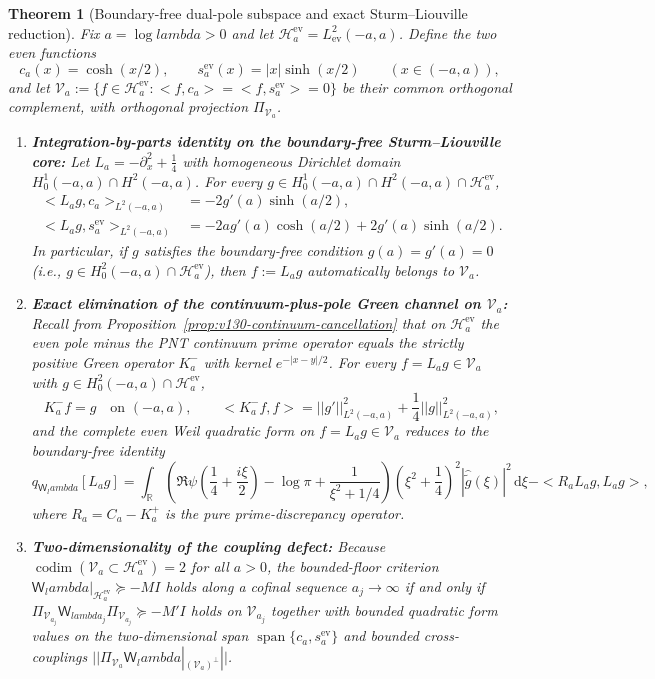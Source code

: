 \documentclass[11pt]{article}
\def\lambda{lambda}%
\def\norm#1{||#1||}%
\def\ip#1#2{<#1,#2>}%
\newtheorem{theorem}{Theorem}[section]
\theoremstyle{remark}
\newcommand{\norm}[1]{\left\lVert #1\right\rVert}
\newcommand{\ip}[2]{\left\langle #1,#2\right\rangle}
\newcommand{\dd}{\mathrm d}
\begin{document}
\begin{theorem}[Boundary-free dual-pole subspace and exact Sturm--Liouville reduction]\label{thm:v2-dual-pole}
Fix $a=\log\lambda>0$ and let $\mathcal H_a^{\mathrm{ev}}=L^2_{\mathrm{ev}}(-a,a)$. Define the two even functions
\[
 c_a(x)=\cosh(x/2),\qquad s_a^{\mathrm{ev}}(x)=|x|\sinh(x/2)\qquad (x\in(-a,a)),
\]
and let $\mathcal V_a := \{f\in \mathcal H_a^{\mathrm{ev}} : \ip{f}{c_a}=\ip{f}{s_a^{\mathrm{ev}}}=0\}$ be their common orthogonal complement, with orthogonal projection $\Pi_{\mathcal V_a}$.
\begin{enumerate}[label=(\alph*)]
\item \textbf{Integration-by-parts identity on the boundary-free Sturm--Liouville core:} Let $L_a = -\partial_x^2 + \tfrac14$ with homogeneous Dirichlet domain $H_0^1(-a,a)\cap H^2(-a,a)$. For every $g\in H_0^1(-a,a)\cap H^2(-a,a)\cap \mathcal H_a^{\mathrm{ev}}$,
\begin{align*}
 \ip{L_a g}{c_a}_{L^2(-a,a)} &= -2g'(a)\sinh(a/2),\\
 \ip{L_a g}{s_a^{\mathrm{ev}}}_{L^2(-a,a)} &= -2a g'(a)\cosh(a/2) + 2g'(a)\sinh(a/2).
\end{align*}
In particular, if $g$ satisfies the boundary-free condition $g(a)=g'(a)=0$ (i.e., $g\in H_0^2(-a,a)\cap\mathcal H_a^{\mathrm{ev}}$), then $f := L_a g$ automatically belongs to $\mathcal V_a$.
\item \textbf{Exact elimination of the continuum-plus-pole Green channel on $\mathcal V_a$:} Recall from Proposition~\ref{prop:v130-continuum-cancellation} that on $\mathcal H_a^{\mathrm{ev}}$ the even pole minus the PNT continuum prime operator equals the strictly positive Green operator $K_a^-$ with kernel $e^{-|x-y|/2}$. For every $f = L_a g \in \mathcal V_a$ with $g\in H_0^2(-a,a)\cap\mathcal H_a^{\mathrm{ev}}$,
\[
 K_a^- f = g\quad\text{on }(-a,a),\qquad \ip{K_a^- f}{f} = \norm{g'}_{L^2(-a,a)}^2 + \frac14\norm{g}_{L^2(-a,a)}^2,
\]
and the complete even Weil quadratic form on $f=L_a g\in\mathcal V_a$ reduces to the boundary-free identity
\begin{equation}\label{eq:v2-dual-pole-form}
 q_{\mathsf W_\lambda}[L_a g] = \int_{\mathbb R}\left(\Re\psi\!\left(\frac14+\frac{i\xi}{2}\right)-\log\pi + \frac{1}{\xi^2+1/4}\right)\left(\xi^2+\frac14\right)^2|\widehat{\widetilde g}(\xi)|^2\,\dd\xi - \ip{R_a L_a g}{L_a g},
\end{equation}
where $R_a = C_a - K_a^+$ is the pure prime-discrepancy operator.
\item \textbf{Two-dimensionality of the coupling defect:} Because $\operatorname{codim}(\mathcal V_a\subset \mathcal H_a^{\mathrm{ev}})=2$ for all $a>0$, the bounded-floor criterion $\mathsf W_\lambda|_{\mathcal H_a^{\mathrm{ev}}}\succeq -M I$ holds along a cofinal sequence $a_j\to\infty$ if and only if $\Pi_{\mathcal V_{a_j}}\mathsf W_{\lambda_j}\Pi_{\mathcal V_{a_j}}\succeq -M' I$ holds on $\mathcal V_{a_j}$ together with bounded quadratic form values on the two-dimensional span $\operatorname{span}\{c_a,s_a^{\mathrm{ev}}\}$ and bounded cross-couplings $\norm{\Pi_{\mathcal V_a}\mathsf W_\lambda|_{(\mathcal V_a)^\perp}}$.
\end{enumerate}
\end{theorem}
\end{document}
